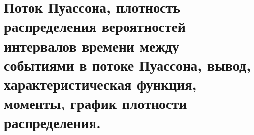 \documentclass[polytech/stats/exam-2023/stats-exam-2023.tex]{subfiles}
\begin{document}
\section{Поток Пуассона, плотность распределения вероятностей интервалов времени между событиями в потоке Пуассона, вывод, характеристическая функция, моменты, график плотности распределения.}
\end{document}
